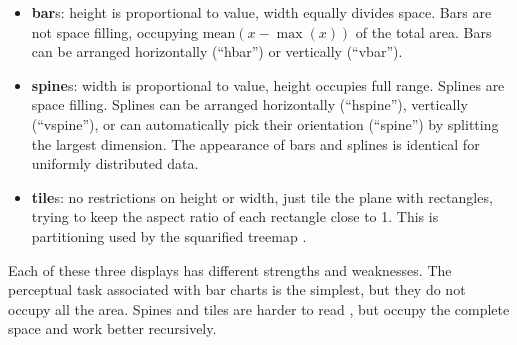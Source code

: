 \documentclass[letterpaper,oneside]{scrartcl}
\begin{document}
\begin{itemize}

  \item {\bf bar}s: height is proportional to value, width equally divides space. Bars are not space filling, occupying $\mbox{mean}(x - \max(x))$ of the total area. Bars can be arranged horizontally (``hbar'') or vertically (``vbar'').

  \item {\bf spine}s: width is proportional to value, height occupies full range. Splines are space filling. Splines can be arranged horizontally (``hspine''), vertically (``vspine''), or can automatically pick their orientation (``spine'') by splitting the largest dimension. The appearance of bars and splines is identical for uniformly distributed data.

  \item {\bf tile}s: no restrictions on height or width, just tile the plane with rectangles, trying to keep the aspect ratio of each rectangle close to 1. This is partitioning used by the squarified treemap \citep{bruls:1999}.

\end{itemize}

Each of these three displays has different strengths and weaknesses.  The perceptual task associated with bar charts is the simplest, but they do not occupy all the area. Spines and tiles are harder to read \citep{heer:2010}, but occupy the complete space and work better recursively.
\end{document}
